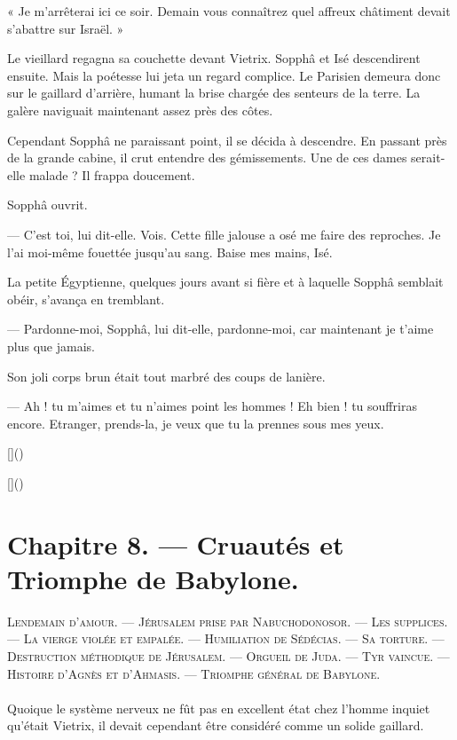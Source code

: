 \documentclass[a4paper, 11pt, oneside, polutonikogreek, french]{article}
\begin{document}
« Je m'arrêterai ici ce soir. Demain vous connaîtrez quel affreux châtiment devait s'abattre sur Israël. »

\bigskip
\centerline{\EightStarTaper}
\centerline{\EightStarTaper\EightStarTaper}
\bigskip

Le vieillard regagna sa couchette devant Vietrix. Sopphâ et Isé descendirent ensuite. Mais la poétesse lui jeta un regard complice. Le Parisien demeura donc sur le gaillard d'arrière, humant la brise chargée des senteurs de la terre. La galère naviguait maintenant assez près des côtes.

Cependant Sopphâ ne paraissant point, il se décida à descendre. En passant près de la grande cabine, il crut entendre des gémissements. Une de ces dames serait-elle malade ? Il frappa doucement.

Sopphâ ouvrit.

--- C'est toi, lui dit-elle. Vois. Cette fille jalouse a osé me faire des reproches. Je l'ai moi-même fouettée jusqu'au sang. Baise mes mains, Isé.

La petite Égyptienne, quelques jours avant si fière et à laquelle Sopphâ semblait obéir, s'avança en tremblant.

--- Pardonne-moi, Sopphâ, lui dit-elle, pardonne-moi, car maintenant je t'aime plus que jamais.

Son joli corps brun était tout marbré des coups de lanière.

--- Ah ! tu m'aimes et tu n'aimes point les hommes ! Eh bien ! tu souffriras encore. Etranger, prends-la, je veux que tu la prennes sous mes yeux.

[]()

[]()
\clearpage
\section{Chapitre 8. --- Cruautés et Triomphe de Babylone.}
\begin{center}
\scshape
\small
Lendemain d'amour. --- Jérusalem prise par Nabuchodonosor. --- Les supplices. --- La vierge violée et empalée. --- Humiliation de Sédécias. --- Sa torture. --- Destruction méthodique de Jérusalem. --- Orgueil de Juda. --- Tyr vaincue. --- Histoire d'Agnès et d'Ahmasis. --- Triomphe général de Babylone.
\end{center}
\paragraph{}
Quoique le système nerveux ne fût pas en excellent état chez l'homme inquiet qu'était Vietrix, il devait cependant être considéré comme un solide gaillard.
\end{document}
